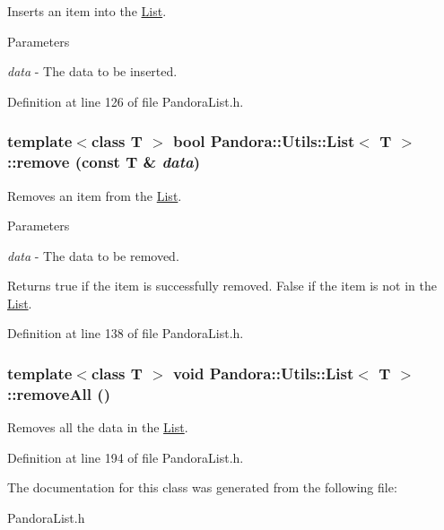 Inserts an item into the \hyperlink{classPandora_1_1Utils_1_1List}{List}. 
\begin{DoxyParams}{Parameters}
\item[{\em data}]-\/ The data to be inserted. \end{DoxyParams}


Definition at line 126 of file PandoraList.h.\hypertarget{classPandora_1_1Utils_1_1List_a045ecf8edb94f60efc41a5d864c7dca6}{
\subsubsection[{remove}]{\setlength{\rightskip}{0pt plus 5cm}template$<$class T $>$ bool {\bf Pandora::Utils::List}$<$ T $>$::remove (const T \& {\em data})}}
\label{classPandora_1_1Utils_1_1List_a045ecf8edb94f60efc41a5d864c7dca6}


Removes an item from the \hyperlink{classPandora_1_1Utils_1_1List}{List}. 
\begin{DoxyParams}{Parameters}
\item[{\em data}]-\/ The data to be removed. \end{DoxyParams}
\begin{DoxyReturn}{Returns}
true if the item is successfully removed. False if the item is not in the \hyperlink{classPandora_1_1Utils_1_1List}{List}. 
\end{DoxyReturn}


Definition at line 138 of file PandoraList.h.\hypertarget{classPandora_1_1Utils_1_1List_a2dcb0105be0541caf1084c7faa4d1566}{
\subsubsection[{removeAll}]{\setlength{\rightskip}{0pt plus 5cm}template$<$class T $>$ void {\bf Pandora::Utils::List}$<$ T $>$::removeAll ()}}
\label{classPandora_1_1Utils_1_1List_a2dcb0105be0541caf1084c7faa4d1566}


Removes all the data in the \hyperlink{classPandora_1_1Utils_1_1List}{List}. 

Definition at line 194 of file PandoraList.h.

The documentation for this class was generated from the following file:\begin{DoxyCompactItemize}
\item 
PandoraList.h\end{DoxyCompactItemize}
